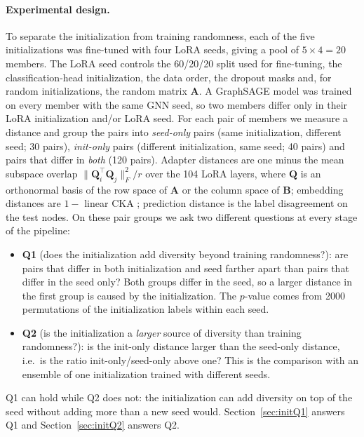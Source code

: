\documentclass[a4paper,fleqn]{cas-sc}
\DeclareRobustCommand{\revcommon}[2][]{\textcolor{revshared}{#2}} %
\begin{document}
\paragraph{\revcommon{Experimental design.}}
\revcommon[R1,R2,R4]{To separate the initialization from training randomness, each of the five initializations was fine-tuned with four LoRA seeds, giving a pool of $5\times4=20$ members.
The LoRA seed controls the 60/20/20 split used for fine-tuning, the classification-head initialization, the data order, the dropout masks and, for random initializations, the random matrix $\mathbf{A}$. A GraphSAGE model was trained on every member with the same GNN seed, so two members differ only in their LoRA initialization and/or LoRA seed. For each pair of members we measure a distance and group the pairs into \emph{seed-only} pairs (same initialization, different seed; 30 pairs), \emph{init-only} pairs (different initialization, same seed; 40 pairs) and pairs that differ in \emph{both} (120 pairs). Adapter distances are one minus the mean subspace overlap $\|\mathbf{Q}_i^{\top}\mathbf{Q}_j\|_F^2/r$ over the 104 LoRA layers, where $\mathbf{Q}$ is an orthonormal basis of the row space of $\mathbf{A}$ or the column space of $\mathbf{B}$; embedding distances are $1-$ linear CKA \citep{kornblith2019cka}; prediction distance is the label disagreement on the test nodes. On these pair groups we ask two different questions at every stage of the pipeline:}
\begin{itemize}
    \item \revcommon[R1,R2,R4]{\textbf{Q1} (does the initialization add diversity beyond training randomness?): are pairs that differ in both initialization and seed farther apart than pairs that differ in the seed only? Both groups differ in the seed, so a larger distance in the first group is caused by the initialization. The $p$-value comes from 2000 permutations of the initialization labels within each seed.}
    \item \revcommon[R1,R2,R4]{\textbf{Q2} (is the initialization a \emph{larger} source of diversity than training randomness?): is the init-only distance larger than the seed-only distance, i.e.\ is the ratio init-only/seed-only above one? This is the comparison with an ensemble of one initialization trained with different seeds.}
\end{itemize}
\revcommon[R1,R2,R4]{Q1 can hold while Q2 does not: the initialization can add diversity on top of the seed without adding more than a new seed would. Section~\ref{sec:initQ1} answers Q1 and Section~\ref{sec:initQ2} answers Q2.}
\end{document}
